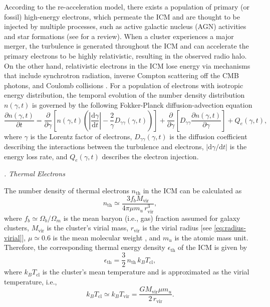 \documentclass[modern]{aastex62}
\newcommand{\R}[1]{\mathrm{#1}}
\newcommand{\D}[1]{\R{d} #1}
\newcommand{\diff}[2]{\frac{\D{#1}}{\D{#2}}}
\newcommand{\pdiff}[2]{\frac{\partial #1}{\partial #2}}
\newcommand{\editone}[1]{{\leavevmode\color{cyan}#1}}
\newcounter{sssseccount}
\newcommand{\sssseclabel}{\alph{sssseccount}}
\newcommand{\ssssec}[1]{%
  \vspace{1ex}%
  \stepcounter{sssseccount}%
  \noindent\emph{\sssseclabel. #1}%
}
\begin{document}
According to the re-acceleration model, there exists a population of
primary (or fossil) high-energy electrons, which permeate the ICM and
are thought to be injected by multiple processes, such as active
galactic nucleus (AGN) activities and star formations
(see \citealt{blasi2007rev} for a review).
When a cluster experiences a major merger, the turbulence is generated
throughout the ICM and can accelerate the primary electrons to be highly
relativistic, resulting in the observed radio halo.
On the other hand, relativistic electrons in the ICM lose energy via
mechanisms that include synchrotron radiation, inverse Compton scattering
off the CMB photons, and Coulomb collisions \citep{sarazin1999}.
For a population of electrons with isotropic energy distribution, the
temporal evolution of the number density distribution $n(\gamma, t)$
is governed by the following Fokker-Planck diffusion-advection equation
\citep{eilek1991,schlickeiser2002}
\begin{equation}
  \label{eq:fokkerplanck}
  \pdiff{n(\gamma,t)}{t} = \pdiff{}{\gamma} \left[ n(\gamma,t) \left(
      \left| \diff{\gamma}{t} \right| -
      \frac{2}{\gamma} D_{\gamma\gamma}(\gamma, t) \right) \right] +
    \pdiff{}{\gamma} \left[ D_{\gamma\gamma} \pdiff{n(\gamma,t)}{\gamma}
    \right] + Q_e(\gamma,t),
\end{equation}
where $\gamma$ is the Lorentz factor of electrons,
$D_{\gamma\gamma}(\gamma, t)$ is the diffusion coefficient describing
the interactions between the turbulence and electrons,
$|\R{d}\gamma / \R{d}t|$ is the energy loss rate,
and $Q_e(\gamma, t)$ describes the electron injection.

\setcounter{sssseccount}{0}
\ssssec{Thermal Electrons}

The number density of thermal electrons $n_{\R{th}}$ in the ICM can be
calculated as
\begin{equation}
  \label{eq:n-th}
  n_{\R{th}} \simeq \frac{3 f_b M_{\R{vir}}}{4\pi \mu m_u \,r^3_{\R{vir}}},
\end{equation}
where
$f_b \simeq \Omega_b/\Omega_m$ is the mean baryon (i.e., gas) fraction
assumed for galaxy clusters,
$M_{\R{vir}}$ is the cluster's virial mass,
$r_{\R{vir}}$ is the virial radius [see \autoref{eq:radius-virial}],
$\mu \simeq 0.6$ is the mean molecular weight \citep[e.g.,][]{ettori2013},
and $m_u$ is the atomic mass unit.
Therefore, the corresponding thermal energy density $\epsilon_{\R{th}}$
of the ICM is given by
\begin{equation}
  \label{eq:e-th}
  \epsilon_{\R{th}} = \frac{3}{2} \,n_{\R{th}} \,k_B T_{\R{cl}},
\end{equation}
where
\editone{$k_B T_{\R{cl}}$ is the cluster's mean temperature and is
approximated as the virial temperature, i.e.,
\begin{equation}
  \label{eq:kt}
  k_B T_{\R{cl}} \simeq k_B T_{\R{vir}}
    = \frac{G M_{\R{vir}} \mu m_u}{2 \,r_{\R{vir}}} .
\end{equation}
} %
\end{document}

